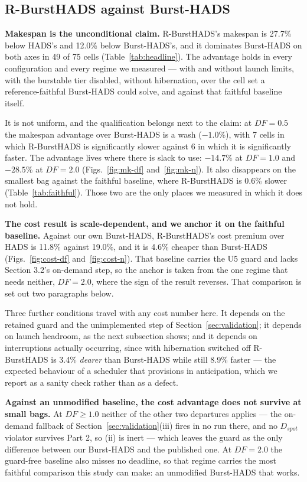 \documentclass[conference]{IEEEtran}
\begin{document}
\subsection{R-BurstHADS against Burst-HADS}

\textbf{Makespan is the unconditional claim.} R-BurstHADS's makespan is 27.7\%
below HADS's and 12.0\% below Burst-HADS's, and it dominates Burst-HADS on both
axes in 49 of 75 cells (Table~\ref{tab:headline}). The advantage holds in every
configuration and every regime we measured --- with and without launch limits,
with the burstable tier disabled, without hibernation, over the cell set a
reference-faithful Burst-HADS could solve, and against that faithful baseline
itself.

It is not uniform, and the qualification belongs next to the claim: at
$\mathit{DF} = 0.5$ the makespan advantage over Burst-HADS is a wash
($-1.0$\%), with 7 cells in which R-BurstHADS is significantly slower against 6
in which it is significantly faster. The advantage lives where there is slack
to use: $-14.7$\% at $\mathit{DF} = 1.0$ and $-28.5$\% at $\mathit{DF} = 2.0$
(Figs.~\ref{fig:mk-df} and~\ref{fig:mk-n}). It also disappears on the smallest
bag against the faithful baseline, where R-BurstHADS is 0.6\% slower
(Table~\ref{tab:faithful}). Those two are the only places we measured in which
it does not hold.

\textbf{The cost result is scale-dependent, and we anchor it on the faithful
baseline.} Against our own Burst-HADS, R-BurstHADS's cost premium over HADS is
11.8\% against 19.0\%, and it is 4.6\% cheaper than Burst-HADS
(Figs.~\ref{fig:cost-df} and~\ref{fig:cost-n}). That baseline carries the U5
guard and lacks Section 3.2's on-demand step, so the anchor is taken from the one
regime that needs neither, $\mathit{DF} = 2.0$, where the sign of the result
reverses. That comparison is set out two paragraphs below.

Three further conditions travel with any cost number here. It depends on the
retained guard and the unimplemented step of Section~\ref{sec:validation}; it
depends on launch headroom, as the next subsection shows; and it depends on
interruptions actually occurring, since with hibernation switched off
R-BurstHADS is 3.4\% \emph{dearer} than Burst-HADS while still 8.9\% faster ---
the expected behaviour of a scheduler that provisions in anticipation, which we
report as a sanity check rather than as a defect.

\textbf{Against an unmodified baseline, the cost advantage does not survive
at small bags.} At $\mathit{DF} \geq 1.0$ neither of the other two departures
applies --- the on-demand fallback of Section~\ref{sec:validation}(iii) fires
in no run there, and no $D_{\mathit{spot}}$ violator survives Part 2, so (ii)
is inert --- which leaves the guard as the only difference between our
Burst-HADS and the published one. At $\mathit{DF} = 2.0$ the guard-free
baseline also misses no deadline, so that regime carries the most faithful
comparison this study can make: an unmodified Burst-HADS that works.
\end{document}
